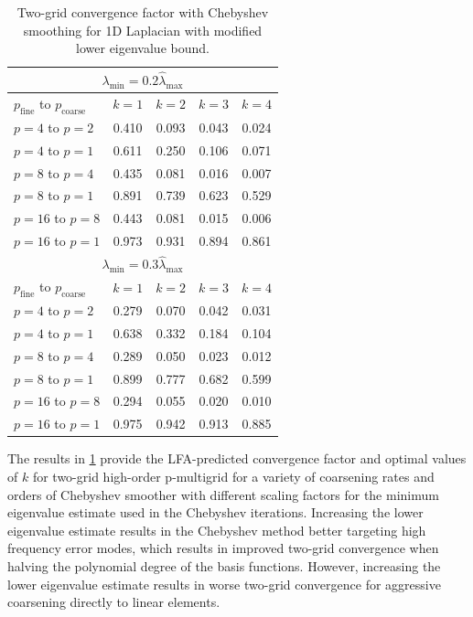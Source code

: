 \documentclass[review]{siamart190516}
\begin{document}
\begin{table}[ht!]
\begin{center}
\begin{tabular}{l c c c c}
  \toprule
  \multicolumn{5}{c}{$\lambda_{\min} = 0.2 \hat{\lambda}_{\max}$} \\
  \toprule
  $p_{\text{fine}}$ to $p_{\text{coarse}}$  &  $k = 1$   &  $k = 2$   &  $k = 3$   &  $k = 4$   \\
  \toprule
  $p = 4$ to $p = 2$   &  0.410  &  0.093  &  0.043  &  0.024  \\
  $p = 4$ to $p = 1$   &  0.611  &  0.250  &  0.106  &  0.071  \\
  \midrule
  $p = 8$ to $p = 4$   &  0.435  &  0.081  &  0.016  &  0.007  \\
  $p = 8$ to $p = 1$   &  0.891  &  0.739  &  0.623  &  0.529  \\
  \midrule
  $p = 16$ to $p = 8$  &  0.443  &  0.081  &  0.015  &  0.006  \\
  $p = 16$ to $p = 1$  &  0.973  &  0.931  &  0.894  &  0.861  \\
  \toprule
  \multicolumn{5}{c}{$\lambda_{\min} = 0.3 \hat{\lambda}_{\max}$} \\
  \toprule
  $p_{\text{fine}}$ to $p_{\text{coarse}}$  &  $k = 1$   &  $k = 2$   &  $k = 3$   &  $k = 4$   \\
  \toprule
  $p = 4$ to $p = 2$   &  0.279  &  0.070  &  0.042  &  0.031  \\
  $p = 4$ to $p = 1$   &  0.638  &  0.332  &  0.184  &  0.104  \\
  \midrule
  $p = 8$ to $p = 4$   &  0.289  &  0.050  &  0.023  &  0.012  \\
  $p = 8$ to $p = 1$   &  0.899  &  0.777  &  0.682  &  0.599  \\
  \midrule
  $p = 16$ to $p = 8$  &  0.294  &  0.055  &  0.020  &  0.010  \\
  $p = 16$ to $p = 1$  &  0.975  &  0.942  &  0.913  &  0.885  \\
  \bottomrule
\end{tabular}
\end{center}
\caption{Two-grid convergence factor with Chebyshev smoothing for 1D Laplacian with modified lower eigenvalue bound.}
\label{table:two_grid_1d_chebyshev_eigenvalues}
\end{table}

The results in \cref{table:two_grid_1d_chebyshev_eigenvalues} provide the LFA-predicted convergence factor and optimal values of $k$ for two-grid high-order p-multigrid for a variety of coarsening rates and orders of Chebyshev smoother with different scaling factors for the minimum eigenvalue estimate used in the Chebyshev iterations.
Increasing the lower eigenvalue estimate results in the Chebyshev method better targeting high frequency error modes, which results in improved two-grid convergence when halving the polynomial degree of the basis functions.
However, increasing the lower eigenvalue estimate results in worse two-grid convergence for aggressive coarsening directly to linear elements.
\end{document}
